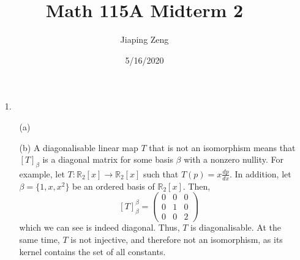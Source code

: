 \documentclass{article}
\title{Math 115A Midterm 2}
\author{Jiaping Zeng}
\date{5/16/2020}
\begin{document}
\begin{itemize}
    \item [1.]
          \begin{itemize}
              \item [(a)]
              \item [(b)] A diagonalisable linear map $T$ that is not an isomorphism means that $[T]_\beta$ is a diagonal matrix for some basis $\beta$ with a nonzero nullity. For example, let $T:\mathbb{R}_2[x]\rightarrow\mathbb{R}_2[x]$ such that $T(p)=x\frac{dp}{dx}$. In addition, let $\beta=\{1,x,x^2\}$ be an ordered basis of $\mathbb{R}_2[x]$. Then, 
              \[[T]_\beta^\beta=\begin{pmatrix}0&0&0\\0&1&0\\0&0&2\end{pmatrix}\] which we can see is indeed diagonal. Thus, $T$ is diagonalisable. At the same time, $T$ is not injective, and therefore not an isomorphism, as its kernel contains the set of all constants.
          \end{itemize}
\end{itemize}
\newpage
\end{document}
